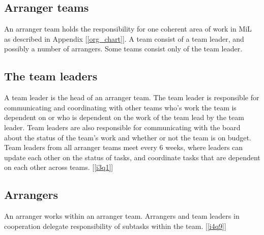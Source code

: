 \subsection{Arranger teams} %
\label{sub:arranger_team}
An arranger team holds the responsibility for one coherent area of work in MiL as described in Appendix [\ref{org_chart}]. A team consist of a team leader, and possibly a number of arrangers. Some teams consist only of the team leader.

\subsection{The team leaders}
\label{sub:team_leaders}
A team leader is the head of an arranger team. The team leader is responsible for communicating and coordinating with other teams who's work the team is dependent on or who is dependent on the work of the team lead by the team leader. Team leaders are also responsible for communicating with the board about the status of the team's work and whether or not the team is on budget. Team leaders from all arranger teams meet every 6 weeks, where leaders can update each other on the status of tasks, and coordinate tasks that are dependent on each other across teams. [\ref{i3q1}]

\subsection{Arrangers}
\label{sub:team_members}
An arranger works within an arranger team. Arrangers and team leaders in cooperation delegate responsibility of subtasks within the team. [\ref{i4q9}]

